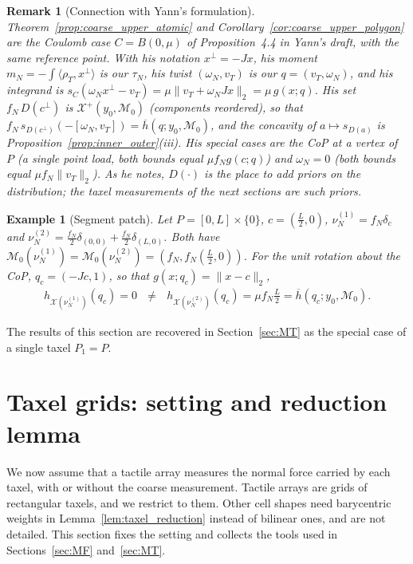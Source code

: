 \documentclass[11pt,a4paper]{article}
\theoremstyle{plain}
\newtheorem{remark}[theorem]{Remark}
\newtheorem{example}[theorem]{Example}
\newcommand{\X}{\mathcal X}
\begin{document}
\begin{remark}[Connection with Yann's formulation]
\label{rem:demontmarin}
    Theorem~\ref{prop:coarse_upper_atomic} and Corollary~\ref{cor:coarse_upper_polygon} are the Coulomb case $C=B(0,\mu)$ of Proposition~4.4 in Yann's draft, with the same
    reference point. With his notation $x^\perp=-Jx$, his moment $m_N=-\int\langle\rho_T,x^\perp\rangle$ is our $\tau_N$, his twist $(\omega_N,v_T)$ is our $q=(v_T,\omega_N)$, and his integrand
    is $s_C(\omega_Nx^\perp-v_T)=\mu\|v_T+\omega_NJx\|_2=\mu\,g(x;q)$. His set $f_N\,D(c^\perp)$ is $\X^+(y_0,\mathcal M_0)$ (components reordered), so that
    $f_N\,s_{D(c^\perp)}(-[\omega_N,v_T])=\overline h(q;y_0,\mathcal M_0)$, and the concavity of $a\mapsto s_{D(a)}$ is Proposition~\ref{prop:inner_outer}(iii). His special cases are
    the CoP at a vertex of $P$ (a single point load, both bounds equal $\mu f_Ng(c;q)$) and $\omega_N=0$ (both bounds equal $\mu f_N\|v_T\|_2$). As he notes, $D(\cdot)$ is the place to add
    priors on the distribution; the taxel measurements of the next sections are such priors.
\end{remark}


\begin{example}[Segment patch]
\label{ex:segment}
    Let $P=[0,L]\times\{0\}$, $c=\left(\frac{L}{2},0\right)$, $\nu_N^{(1)}=f_N\delta_c$ and
    $\nu_N^{(2)}=\frac{f_N}{2}\delta_{(0,0)}+\frac{f_N}{2}\delta_{(L,0)}$. Both have
    $\mathcal M_0(\nu_N^{(1)})=\mathcal M_0(\nu_N^{(2)})=\left(f_N,f_N\left(\frac{L}{2},0\right)\right)$. For the unit rotation about the CoP, $q_c=(-Jc,1)$, so that $g(x;q_c)=\|x-c\|_2$,
    \begin{align}
    h_{\X(\nu_N^{(1)})}(q_c)=0 ~~~\neq~~~ h_{\X(\nu_N^{(2)})}(q_c)=\mu f_N\frac{L}{2}=\overline h(q_c;y_0,\mathcal M_0).
    \end{align}
\end{example}

The results of this section are recovered in Section~\ref{sec:MT} as the special case of a single taxel $P_1=P$.

\section{Taxel grids: setting and reduction lemma}
\label{sec:taxels}

We now assume that a tactile array measures the normal force carried by each taxel, with or without the coarse measurement. Tactile arrays are
grids of rectangular taxels, and we restrict to them. Other cell shapes need barycentric weights in Lemma~\ref{lem:taxel_reduction} instead of bilinear ones, and are not detailed.
This section fixes the setting and collects the tools used in Sections~\ref{sec:MF} and~\ref{sec:MT}.
\end{document}
